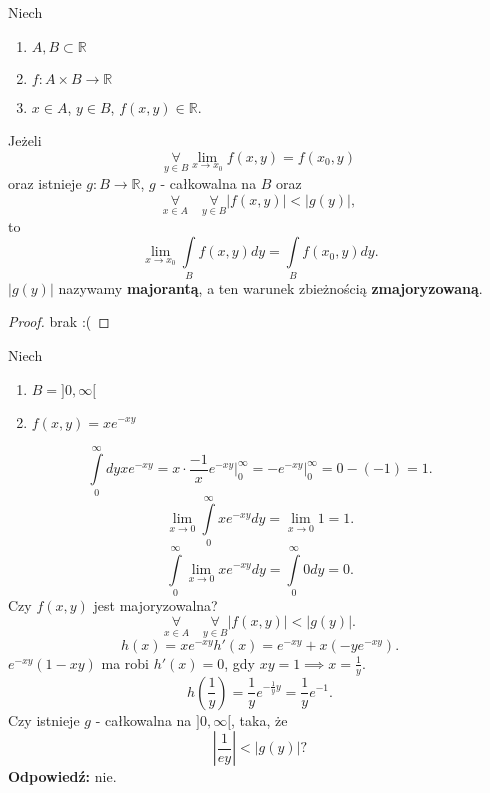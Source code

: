 \documentclass[../main.tex]{subfiles}
\begin{document}
\pagebreak
\begin{tw}
    Niech
    \begin{enumerate}
        \item $A, B \subset \mathbb{R}$
        \item $f: A \times B \to \mathbb{R}$
        \item $x\in A$, $y\in B$, $f(x,y)\in \mathbb{R}$.
    \end{enumerate}
    Jeżeli
    \[
        \underset{y\in B}{\forall} \lim\limits_{x\to x_0}f(x,y) = f(x_0,y)
    \]
    oraz istnieje $g: B\to \mathbb{R}$, $g$ - całkowalna na $B$ oraz
    \[
        \underset{x\in A}{\forall}\quad \underset{y\in B}{\forall} \left| f(x,y) \right| < \left| g(y) \right|
    ,\]
to
\[
    \lim_{x \to x_0}\int\limits_{B}f(x,y)dy = \int\limits_{B}f(x_0,y)dy
.\]
$|g(y)|$ nazywamy \textbf{majorantą}, a ten warunek zbieżnością \textbf{zmajoryzowaną}.
\end{tw}
\begin{proof}
    brak :(
\end{proof}
\begin{przyklad}
    Niech
    \begin{enumerate}
        \item $B = ]0,\infty[$
        \item $f(x,y) = xe^{-xy}$
    \end{enumerate}
    \[
        \int\limits_{0}^{\infty} dy xe^{-xy} = x\cdot \frac{-1}{x} e^{-xy}\Bigg|_{0}^{\infty} = -e^{-xy}\Bigg|_{0}^{\infty} = 0 - (-1) = 1
    .\]
\[
    \lim_{x \to 0} \int\limits_{0}^{\infty} xe^{-xy}dy = \lim_{x \to 0}1 = 1
.\]
\[
    \int\limits_{0}^{\infty} \lim_{x \to 0}xe^{-xy}dy = \int\limits_{0}^{\infty} 0 dy = 0
.\]
Czy $f(x,y)$ jest majoryzowalna?
\[
    \underset{x\in A}{\forall} \quad\underset{y\in B}{\forall} \left| f(x,y) \right| < \left| g(y) \right|
.\]
\[
    h(x) = xe^{-xy}h'(x) = e^{-xy} + x\left( -y e^{-xy} \right)
.\]
$e^{-xy}(1-xy)$ ma robi  $h'(x) = 0$, gdy $xy = 1 \implies x = \frac{1}{y}$.
\[
    h\left(\frac{1}{y}\right) = \frac{1}{y}e^{-\frac{1}{y}y} = \frac{1}{y}e^{-1}
.\]
Czy istnieje $g$ - całkowalna na $]0,\infty[$, taka, że
\[
    \left| \frac{1}{ey} \right| < \left| g(y) \right| ?
\]
\textbf{Odpowiedź:} nie.
\end{przyklad}
\end{document}
